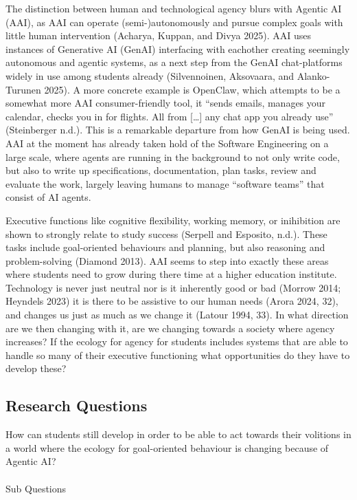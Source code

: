 \documentclass[
  letterpaper,
  DIV=11,
  numbers=noendperiod]{scrartcl}
\makeatletter
\let\oldparagraph\paragraph
\renewcommand{\paragraph}{
    \@ifstar
      \xxxParagraphStar
      \xxxParagraphNoStar
  }
\newcommand{\xxxParagraphStar}[1]{\oldparagraph*{#1}\mbox{}}
\newcommand{\xxxParagraphNoStar}[1]{\oldparagraph{#1}\mbox{}}
\makeatother
\begin{document}
The distinction between human and technological agency blurs with
Agentic AI (AAI), as AAI can operate (semi-)autonomously and pursue
complex goals with little human intervention (Acharya, Kuppan, and Divya
2025). AAI uses instances of Generative AI (GenAI) interfacing with
eachother creating seemingly autonomous and agentic systems, as a next
step from the GenAI chat-platforms widely in use among students already
(Silvennoinen, Aksovaara, and Alanko-Turunen 2025). A more concrete
example is OpenClaw, which attempts to be a somewhat more AAI
consumer-friendly tool, it ``sends emails, manages your calendar, checks
you in for flights. All from {[}\ldots{]} any chat app you already use''
(Steinberger n.d.). This is a remarkable departure from how GenAI is
being used. AAI at the moment has already taken hold of the Software
Engineering on a large scale, where agents are running in the background
to not only write code, but also to write up specifications,
documentation, plan tasks, review and evaluate the work, largely leaving
humans to manage ``software teams'' that consist of AI agents.

Executive functions like cognitive flexibility, working memory, or
inihibition are shown to strongly relate to study success (Serpell and
Esposito, n.d.). These tasks include goal-oriented behaviours and
planning, but also reasoning and problem-solving (Diamond 2013). AAI
seems to step into exactly these areas where students need to grow
during there time at a higher education institute. Technology is never
just neutral nor is it inherently good or bad (Morrow 2014; Heyndels
2023) it is there to be assistive to our human needs (Arora 2024, 32),
and changes us just as much as we change it (Latour 1994, 33). In what
direction are we then changing with it, are we changing towards a
society where agency increases? If the ecology for agency for students
includes systems that are able to handle so many of their executive
functioning what opportunities do they have to develop these?

\subsection{Research Questions}\label{research-questions}

How can students still develop in order to be able to act towards their
volitions in a world where the ecology for goal-oriented behaviour is
changing because of Agentic AI?

\paragraph{Sub Questions}\label{sub-questions}
\end{document}
